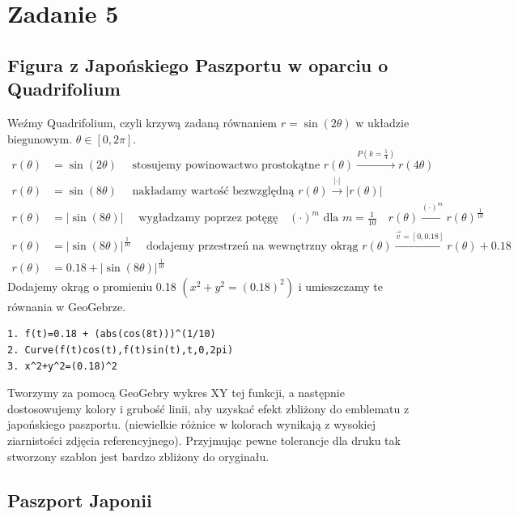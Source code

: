 \documentclass[10pt, a4paper]{article}
\begin{document}
\newpage

\section*{Zadanie 5}

\subsection*{Figura z Japońskiego Paszportu w oparciu o Quadrifolium}

\normalsize
Weźmy Quadrifolium, czyli krzywą zadaną równaniem $r = \sin(2\theta)$ w układzie biegunowym. $\theta \in [0, 2\pi]$. 
\begin{align*}
    r(\theta) &= \sin(2\theta) \quad 
    \text{ stosujemy powinowactwo prostokątne } r(\theta) \xrightarrow{P(k=\frac{1}{4})} r(4\theta) \\
    r(\theta) &= \sin(8\theta) \quad
    \text{ nakładamy wartość bezwzględną } r(\theta) \xrightarrow{|\cdot|} |r(\theta)| \\
    r(\theta) &= |\sin(8\theta)| \quad
    \text{ wygładzamy poprzez potęgę} \quad (\cdot)^m \text{ dla } m=\frac{1}{10} \quad r(\theta) \xrightarrow{(\cdot)^m} r(\theta)^{\frac{1}{10}} \\
    r(\theta) &= |\sin(8\theta)|^{\frac{1}{10}} \quad
    \text{ dodajemy przestrzeń na wewnętrzny okrąg } r(\theta) \xrightarrow{\vec{v}=[0,0.18]} r(\theta) + 0.18 \\
    r(\theta) &= 0.18 + |\sin(8\theta)|^{\frac{1}{10}} \quad
\end{align*}
Dodajemy okrąg o promieniu 0.18 $\left(x^2+y^2=(0.18)^2\right)$ i umieszczamy te równania w GeoGebrze.

\begin{verbatim}
1. f(t)=0.18 + (abs(cos(8t)))^(1/10)
2. Curve(f(t)cos(t),f(t)sin(t),t,0,2pi)
3. x^2+y^2=(0.18)^2
\end{verbatim}
\normalsize

\noindent
Tworzymy za pomocą GeoGebry wykres XY tej funkcji,
a następnie dostosowujemy kolory i grubość linii, aby uzyskać efekt zbliżony do emblematu z japońskiego paszportu.
(niewielkie różnice w kolorach wynikają z wysokiej ziarnistości zdjęcia referencyjnego). Przyjmując pewne tolerancje dla druku
tak stworzony szablon jest bardzo zbliżony do oryginału.

\subsection*{Paszport Japonii}
\end{document}
